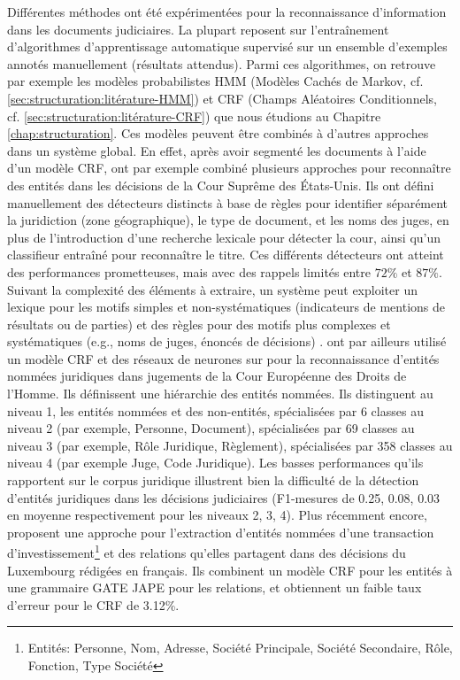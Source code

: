Différentes méthodes ont été expérimentées pour la reconnaissance d'information dans les documents judiciaires. La plupart reposent sur l'entraînement d'algorithmes d'apprentissage automatique supervisé sur un ensemble d'exemples annotés manuellement (résultats attendus). Parmi ces algorithmes, on retrouve par exemple les modèles probabilistes HMM (Modèles Cachés de Markov, cf. \ref{sec:structuration:litérature-HMM}) et CRF (Champs Aléatoires Conditionnels, cf. \ref{sec:structuration:litérature-CRF}) que nous étudions au Chapitre \ref{chap:structuration}. Ces modèles peuvent être combinés à d'autres approches dans un système global. En effet, après avoir segmenté les documents à l'aide d'un modèle CRF, \citet{dozier2010legalnerr} ont par exemple combiné plusieurs approches pour reconnaître des entités dans les décisions de la Cour Suprême des États-Unis. Ils ont défini manuellement des détecteurs distincts à base de règles pour identifier séparément la juridiction (zone géographique), le type de document, et les noms des juges, en plus de l'introduction d'une recherche lexicale pour détecter la cour, ainsi qu'un classifieur entraîné pour reconnaître le titre. Ces différents détecteurs ont atteint des performances prometteuses, mais avec des rappels limités entre $ 72 \% $ et $ 87 \% $. Suivant la complexité des éléments à extraire, un système peut exploiter un lexique pour les motifs simples et non-systématiques (indicateurs de mentions de résultats ou de parties) et des règles pour des motifs plus complexes et systématiques (e.g., noms de juges, énoncés de décisions) \citep{Waltl2016lexia,waltl2017legaliegerman, wyner2010extractlegalelts}. \cite{cardellino2017legalNERCL} ont par ailleurs utilisé un modèle CRF et des réseaux de neurones sur pour la reconnaissance d'entités nommées juridiques dans  jugements de la Cour Européenne des Droits de l'Homme.
Ils définissent une hiérarchie des entités nommées. Ils distinguent au niveau 1, les entités nommées et des non-entités,  spécialisées par 6 classes au niveau 2 (par exemple, Personne, Document), spécialisées par 69 classes au niveau 3 (par exemple, Rôle Juridique, Règlement), spécialisées par 358 classes au niveau 4 (par exemple Juge, Code Juridique). Les basses performances qu'ils rapportent sur le corpus juridique illustrent bien la difficulté de la détection d'entités juridiques dans les décisions judiciaires (F1-mesures de 0.25, 0.08, 0.03 en moyenne respectivement pour les niveaux 2, 3, 4). Plus récemment encore, \citet{andrew2018legalNerAndRelation} proposent une approche pour l'extraction d'entités nommées d'une transaction d'investissement\footnote{Entités: Personne, Nom, Adresse, Société Principale, Société Secondaire, Rôle, Fonction, Type Société} et des relations qu'elles partagent dans des décisions du Luxembourg rédigées en français. Ils combinent un modèle CRF pour les entités à  une grammaire GATE JAPE \citep{thakker2009gatejape} pour les relations, et obtiennent un faible taux d'erreur pour le CRF de 3.12\%. %

